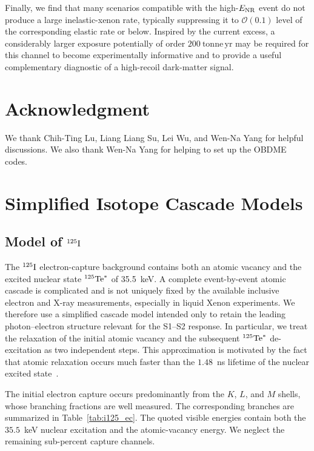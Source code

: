 \documentclass[11pt,a4paper]{article}
\begin{document}
Finally, we find that many scenarios compatible with the high-$E_{\rm NR}$ event do not produce a large inelastic-xenon rate, typically suppressing it to $\mathcal{O}(0.1)$ level of the corresponding elastic rate or below. Inspired by the current excess, a considerably larger exposure potentially of order $200~\mathrm{tonne\,yr}$ may be required for this channel to become experimentally informative and to provide
a useful complementary diagnostic of a high-recoil dark-matter signal.

\section*{Acknowledgment}
We thank Chih-Ting Lu, Liang Liang Su, Lei Wu, and Wen-Na Yang for helpful discussions. We also thank Wen-Na Yang for helping to set up the OBDME codes.




\appendix



\section{Simplified Isotope Cascade Models}
\label{app:isotope}
\subsection{Model of $^{125} {\rm I}$}
\label{sapp:I125}
The $^{125}{\rm I}$ electron-capture background contains both an atomic vacancy and the excited nuclear state $^{125}{\rm Te}^\ast$ of 35.5~keV. A complete event-by-event atomic cascade is complicated and is not uniquely fixed by the available inclusive electron and X-ray measurements, especially in liquid Xenon experiments. We therefore use a simplified cascade model intended only to retain the leading photon--electron structure relevant for the S1--S2 response. In particular, we treat the relaxation of the initial atomic vacancy and the subsequent $^{125}{\rm Te}^{*}$ de-excitation as two independent steps. This approximation is motivated by the fact that atomic relaxation occurs much faster than the $1.48$~ns lifetime of the nuclear excited state~\cite{Alotiby:2019fjj}.

The initial electron capture occurs predominantly from the $K$, $L$, and $M$ shells, whose branching fractions are well measured. The corresponding branches are summarized in Table~\ref{tab:i125_ec}. The quoted visible energies contain both the $35.5$~keV nuclear excitation and the atomic-vacancy energy. We neglect the remaining sub-percent capture channels. 
\end{document}
